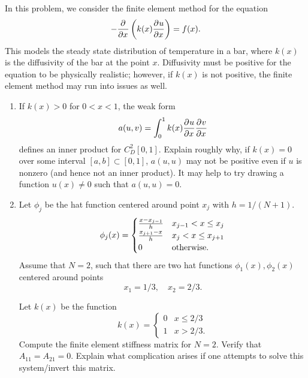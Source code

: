 In this problem, we consider the finite element method for the equation
\[
-\frac{\partial^{} }{\partial x^{}}\left(k(x)\frac{\partial^{} u}{\partial x^{}}\right) = f(x).
\]
This models the steady state distribution of temperature in a bar, where $k(x)$ is the diffusivity of the bar at the point $x$.  Diffusivity must be positive for the equation to be physically realistic; however, if $k(x)$ is not positive, the finite element method may run into issues as well.  


\begin{enumerate}
\item If $k(x) > 0$ for $0 < x < 1$, the weak form
\[
a(u,v) = \int_0^1 k(x)\frac{\partial^{} u}{\partial x^{}}\frac{\partial^{} v}{\partial x^{}}
\]
defines an inner product for $C^2_D[0,1]$.  Explain roughly why, if $k(x) = 0$ over some interval $[a,b] \subset [0,1]$, $a(u,u)$ may not be positive even if $u$ is nonzero (and hence not an inner product).  It may help to try drawing a function $u(x) \neq 0$ such that $a(u,u) = 0$.
\item 
%
Let $\phi_j$ be the hat function centered around point $x_j$ with $h = 1/(N+1)$.
\[
\phi_j(x) = \begin{cases}
\frac{x-x_{j-1}}{h} & x_{j-1} < x \leq x_j\\
\frac{x_{j+1}-x}{h} & x_{j} < x \leq x_{j+1}\\
0 & {\rm otherwise}.
\end{cases}
\]
Assume that $N = 2$, such that there are two hat functions $\phi_1(x),\phi_2(x)$ centered around points 
\[
x_1 = 1/3, \quad x_2 = 2/3.
\]

Let $k(x)$ be the function
\[
k(x) = \begin{cases}
0 & x \leq 2/3\\
1 & x > 2/3.
\end{cases}
\]
Compute the finite element stiffness matrix for $N=2$.  Verify that $A_{11} = A_{21} = 0$.
Explain what complication arises if one attempts to solve this system/invert this matrix.  %
\end{enumerate}